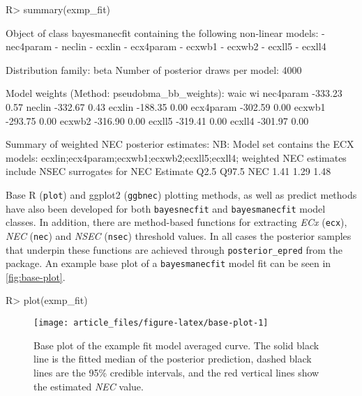 \documentclass[
]{jss}
\begin{document}
\begin{CodeChunk}
\begin{CodeInput}
R> summary(exmp_fit)
\end{CodeInput}
\begin{CodeOutput}
Object of class bayesmanecfit containing the following non-linear models:
  -  nec4param
  -  neclin
  -  ecxlin
  -  ecx4param
  -  ecxwb1
  -  ecxwb2
  -  ecxll5
  -  ecxll4

Distribution family: beta
Number of posterior draws per model:  4000

Model weights (Method: pseudobma_bb_weights):
             waic   wi
nec4param -333.23 0.57
neclin    -332.67 0.43
ecxlin    -188.35 0.00
ecx4param -302.59 0.00
ecxwb1    -293.75 0.00
ecxwb2    -316.90 0.00
ecxll5    -319.41 0.00
ecxll4    -301.97 0.00


Summary of weighted NEC posterior estimates:
NB: Model set contains the ECX models: ecxlin;ecx4param;ecxwb1;ecxwb2;ecxll5;ecxll4; weighted NEC estimates include NSEC surrogates for NEC
    Estimate Q2.5 Q97.5
NEC     1.41 1.29  1.48
\end{CodeOutput}
\end{CodeChunk}

Base R (\texttt{plot}) and ggplot2 (\texttt{ggbnec}) plotting methods,
as well as predict methods have also been developed for both
\texttt{bayesnecfit} and \texttt{bayesmanecfit} model classes. In
addition, there are method-based functions for extracting \emph{ECx}
(\texttt{ecx}), \emph{NEC} (\texttt{nec}) and \emph{NSEC}
(\texttt{nsec}) threshold values. In all cases the posterior samples
that underpin these functions are achieved through
\texttt{posterior\_epred} from the  package. An example base
plot of a \texttt{bayesmanecfit} model fit can be seen in
\autoref{fig:base-plot}.

\begin{CodeChunk}
\begin{CodeInput}
R> plot(exmp_fit)
\end{CodeInput}
\begin{figure}

{\centering \texttt{[image: article\_files/figure-latex/base-plot-1]} 

}

\caption[Base plot of the example fit model averaged curve]{Base plot of the example fit model averaged curve. The solid black line is the fitted median of the posterior prediction, dashed black lines are the 95\% credible intervals, and the red vertical lines show the estimated \textit{NEC} value.}\label{fig:base-plot}
\end{figure}
\end{CodeChunk}
\end{document}
